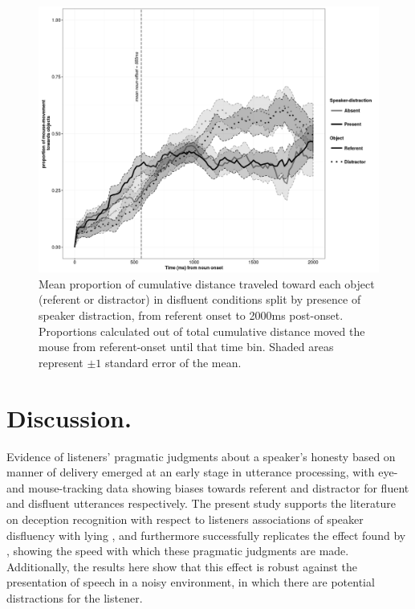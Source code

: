 \documentclass[a4paper,man,natbib]{apa6}
\begin{document}
\begin{figure}[Ht]
  \centering
	\includegraphics[scale=.5]{mdisfl.png}
  \caption{Mean proportion of cumulative distance traveled toward each object (referent or distractor) in disfluent conditions split by presence of speaker distraction, from referent onset to 2000ms post-onset. Proportions calculated out of total cumulative distance moved the mouse from referent-onset until that time bin. Shaded areas represent $\pm 1$ standard error of the mean.}
  \label{fig:mdis}
\end{figure}




\section{Discussion.}

Evidence of listeners' pragmatic judgments about a speaker's honesty based on manner of delivery emerged at an early stage in utterance processing, with eye- and mouse-tracking data showing biases towards referent and distractor for fluent and disfluent utterances respectively.
The present study supports the literature on deception recognition with respect to listeners associations of speaker disfluency with lying \citep{Zuckerman1981,depaulo2003cues}, and furthermore successfully replicates the effect found by \citet{Loy2016}, showing the speed with which these  pragmatic judgments are made.
Additionally, the results here show that this effect is robust against the presentation of speech in a noisy environment, in which there are potential distractions for the listener. 
\\
\end{document}
